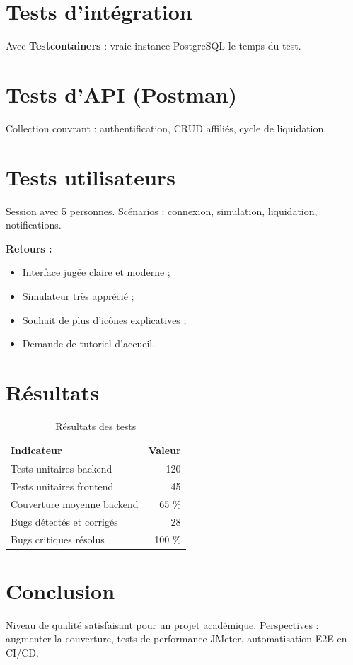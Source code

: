 \documentclass[12pt,a4paper,oneside]{report}
\begin{document}
\section{Tests d'intégration}
Avec \textbf{Testcontainers} : vraie instance PostgreSQL le temps du test.

\section{Tests d'API (Postman)}
Collection couvrant : authentification, CRUD affiliés, cycle de liquidation.

\section{Tests utilisateurs}
Session avec 5 personnes. Scénarios : connexion, simulation, liquidation, notifications.

\textbf{Retours :}
\begin{itemize}
    \item Interface jugée claire et moderne ;
    \item Simulateur très apprécié ;
    \item Souhait de plus d'icônes explicatives ;
    \item Demande de tutoriel d'accueil.
\end{itemize}

\section{Résultats}
\begin{table}[H]
\centering
\caption{Résultats des tests}
\begin{tabular}{lr}
\toprule
\textbf{Indicateur} & \textbf{Valeur} \\
\midrule
Tests unitaires backend & 120 \\
Tests unitaires frontend & 45 \\
Couverture moyenne backend & 65 \% \\
Bugs détectés et corrigés & 28 \\
Bugs critiques résolus & 100 \% \\
\bottomrule
\end{tabular}
\end{table}

\section{Conclusion}
Niveau de qualité satisfaisant pour un projet académique. Perspectives : augmenter la couverture, tests de performance JMeter, automatisation E2E en CI/CD.
\end{document}
